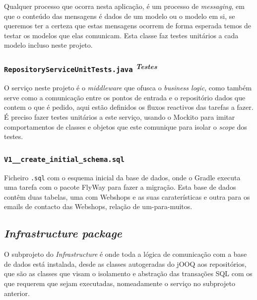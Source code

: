 Qualquer processo que ocorra nesta aplicação, é um processo de \textit{messaging}, em que o conteúdo das mensagens é dados de um modelo ou o modelo em si, se queremos ter a certeza que estas mensagens ocorrem de forma esperada temos de testar os modelos que elas comunicam. Esta classe faz testes unitários a cada modelo incluso neste projeto.

\subsubsection*{\texttt{RepositoryServiceUnitTests.java} \textsuperscript{\textit{Testes}}}

O serviço neste projeto é o \textit{middleware} que ofusca o \textit{business logic}, como também serve como a comunicação entre os pontos de entrada e o repositório dados que contem o que é pedido, aqui estão definidos os fluxos reactivos das tarefas a fazer. É preciso fazer testes unitários a este serviço, usando o Mockito para imitar comportamentos de classes e objetos que este comunique para isolar o \textit{scope} dos testes.

\subsubsection*{\texttt{V1\_\_create\_initial\_schema.sql}}

Ficheiro \texttt{.sql} com o esquema inicial da base de dados, onde o Gradle executa uma tarefa com o pacote FlyWay para fazer a migração. Esta base de dados contêm duas tabelas, uma com Webshops e as suas caraterísticas e outra para os emails de contacto das Webshops, relação de um-para-muitos.

\subsection{\textit{\textit{Infrastructure} package}}\label{infra}

O subprojeto do \textit{Infrastructure} é onde toda a lógica de comunicação com a base de dados está instalada, desde as classes autogeradas do jOOQ aos repositórios, que são as classes que visam o isolamento e abstração das transações SQL com os que requerem que sejam executadas, nomeadamente o serviço no subprojeto anterior.

